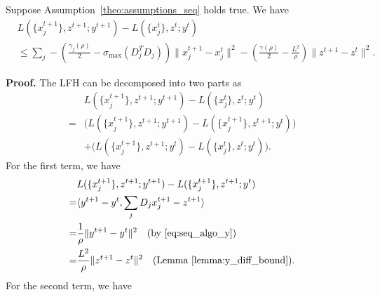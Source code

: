 \begin{lemma}\label{lemma:L_iter_diff_pal}
Suppose Assumption~\ref{theo:assumptions_seq} holds true. We have
\begin{align}
    & L(\{x_j^{t+1}\},z^{t+1};y^{t+1}) - L(\{x_j^{t}\},z^{t};y^{t})\nonumber\\
    & \le \sum_j -\left(\frac{\gamma_j(\rho)}{2}-\sigma_{\text{max}}(D_j^T D_j)\right)\|x_j^{t+1} - x_j^t\|^2 - \left(\frac{\gamma(\rho)}{2} - \frac{L^2}{\rho}\right)\|z^{t+1} - z^t\|^2. \nonumber
\end{align}
\end{lemma}
{\bf Proof.} The LFH can be decomposed into two parts as
\begin{align}
    & L(\{x_j^{t+1}\},z^{t+1};y^{t+1}) - L(\{x_j^{t}\},z^{t};y^{t})\nonumber\\
    = & \big(L(\{x_j^{t+1}\},z^{t+1};y^{t+1}) - L(\{x_j^{t+1}\},z^{t+1};y^{t})\big)\nonumber\\
    & + \big(L(\{x_j^{t+1}\},z^{t+1};y^{t}) - L(\{x_j^{t}\},z^{t};y^{t})\big). \label{eq:proof_diff_L_0_pal}
\end{align}
For the first term, we have
\begin{align}
    & L(\{x_j^{t+1}\},z^{t+1};y^{t+1}) - L(\{x_j^{t+1}\},z^{t+1};y^{t})\nonumber\\
    = & \langle y^{t+1} - y^t , \sum_jD_jx_j^{t+1} - z^{t+1}\rangle\nonumber\\
    = & \frac{1}{\rho}\|y^{t+1} - y^t\|^2\quad\text{(by \eqref{eq:seq_algo_y})}\nonumber\\
    = & \frac{L^2}{\rho}\|z^{t+1} - z^t\|^2\quad\text{(Lemma~\ref{lemma:y_diff_bound})}\label{eq:proof_diff_L_1_pal}.
\end{align}
For the second term, we have
